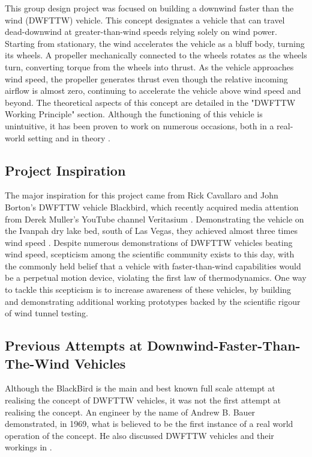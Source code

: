 This group design project was focused on building a downwind faster than the wind (DWFTTW) vehicle. This concept designates a vehicle that can travel dead-downwind at greater-than-wind speeds relying solely on wind power. Starting from stationary, the wind accelerates the vehicle as a bluff body, turning its wheels. A propeller mechanically connected to the wheels rotates as the wheels turn, converting torque from the wheels into thrust. As the vehicle approaches wind speed, the propeller generates thrust even though the relative incoming airflow is almost zero, continuing to accelerate the vehicle above wind speed and beyond. The theoretical aspects of this concept are detailed in the "DWFTTW Working Principle" section. Although the functioning of this vehicle is unintuitive, it has been proven to work on numerous occasions, both in a real-world setting \cite{veritasiumvid} and in theory \cite{drela20dead}.

\subsection{Project Inspiration}

The major inspiration for this project came from Rick Cavallaro and John Borton's DWFTTW vehicle Blackbird, which recently acquired media attention from Derek Muller's YouTube channel Veritasium \cite{veritasiumvid}. Demonstrating the vehicle on the Ivanpah dry lake bed, south of Las Vegas, they achieved almost three times wind speed \cite{downwindRecord}. Despite numerous demonstrations of DWFTTW vehicles beating wind speed, scepticism among the scientific community exists to this day, with the commonly held belief that a vehicle with faster-than-wind capabilities would be a perpetual motion device, violating the first law of thermodynamics. One way to tackle this scepticism is to increase awareness of these vehicles, by building and demonstrating additional working prototypes backed by the scientific rigour of wind tunnel testing.

\subsection{Previous Attempts at Downwind-Faster-Than-The-Wind Vehicles}

Although the BlackBird is the main and best known full scale attempt at realising the concept of DWFTTW vehicles, it was not the first attempt at realising the concept. An engineer by the name of Andrew B. Bauer demonstrated, in 1969, what is believed to be the first instance of a real world operation of the concept. He also discussed DWFTTW vehicles and their workings in \cite{bauer1969faster}.

